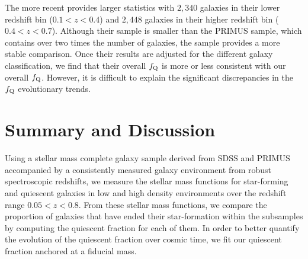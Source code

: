 \documentclass{emulateapj}
\begin{document}
The more recent \cite{Kovac:2014aa} provides larger statistics with
$2,340$ galaxies in their lower redshift bin ($0.1 < z < 0.4$) and
$2,448$ galaxies in their higher redshift bin ($0.4 < z <
0.7$). Although their sample is smaller than the PRIMUS sample, which
contains over two times the number of galaxies, the
\cite{Kovac:2014aa} sample provides a more stable comparison.  Once
their results are adjusted for the different galaxy classification, we
find that their overall $f_{\rm{Q}}$ is more or less consistent with
our overall $f_{\rm{Q}}$. However, it is difficult to explain the
significant discrepancies in the $f_{\rm{Q}}$ evolutionary trends.

\section{Summary and Discussion} \label{sec:summary}
Using a stellar mass complete galaxy sample derived from SDSS and
PRIMUS accompanied by a consistently measured galaxy environment from
robust spectroscopic redshifts, we measure the stellar mass functions
for star-forming and quiescent galaxies in low and high density
environments over the redshift range $0.05 < z < 0.8$. From these
stellar mass functions, we compare the proportion of galaxies that
have ended their star-formation within the subsamples by computing the
quiescent fraction for each of them. In order to better quantify the
evolution of the quiescent fraction over cosmic time, we fit our
quiescent fraction anchored at a fiducial mass. 
\end{document}
